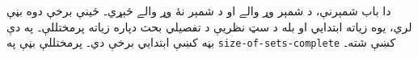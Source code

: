 \documentclass[../../../include/open-logic-chapter]{subfiles}
\begin{document}

\begin{editorial}
دا باب شمېرنې، د شمېر وړ والے او د شمېر نۀ وړ والے څېړي۔ ځينې برخې دوه بڼې لري، يوه زياته ابتدايي او بله د سټ نظريې د تفصيلي بحث دپاره زياته پرمختللې۔ په دې بڼه کښې ابتدايي برخې دي۔ پرمختللې بڼې په \verb|size-of-sets-complete| کښې شته۔
\end{editorial}











\OLEndChapterHook
\end{document}
